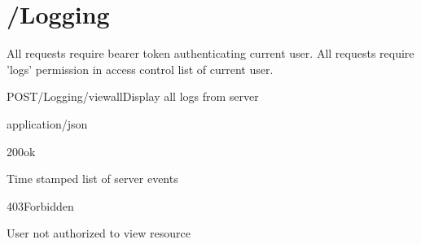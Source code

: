 \documentclass[12pt, etter]{article}
\begin{document}
\section{/Logging}
All requests require bearer token authenticating current user.
All requests require 'logs' permission in access control list of current user.

\begin{apiRoute}{POST}{/Logging/viewall}{Display all logs from server}
    \begin{routeParameter}
    \end{routeParameter}
    \begin{routeResponse}{application/json}
        \begin{routeResponseItem}{200}{ok}
            \begin{routeResponseItemBody}
                Time stamped list of server events
            \end{routeResponseItemBody}
        \end{routeResponseItem}
        \begin{routeResponseItem}{403}{Forbidden}
            \begin{routeResponseItemBody}
                User not authorized to view resource
            \end{routeResponseItemBody}
        \end{routeResponseItem}
    \end{routeResponse}
\end{apiRoute}
\end{document}
